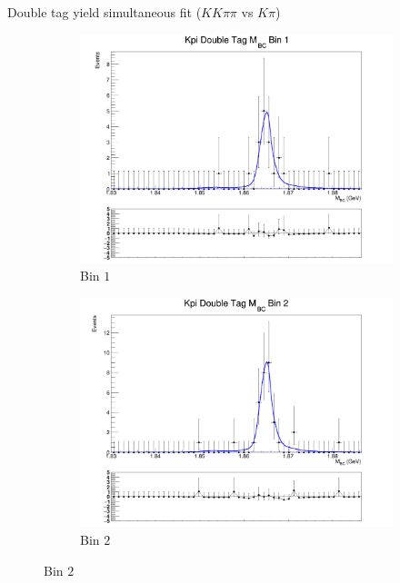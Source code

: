 \documentclass{beamer}
\begin{document}
\begin{frame}{Double tag yield simultaneous fit ($KK\pi\pi$ vs $K\pi$)}
  \begin{figure}
    \centering
    \begin{subfigure}{0.38\textwidth}
      \centering
      \includegraphics[width=\textwidth]{Plots/DoubleTagYield_DoubleTag_Flavour_KKpipi_vs_Kpi_SignalBinP1_TagBin0.png}
      \caption{Bin $1$}
    \end{subfigure}%
    \begin{subfigure}{0.38\textwidth}
      \centering
      \includegraphics[width=\textwidth]{Plots/DoubleTagYield_DoubleTag_Flavour_KKpipi_vs_Kpi_SignalBinP2_TagBin0.png}
      \caption{Bin $2$}
    \end{subfigure}

\end{figure}
\end{frame}
\end{document}

